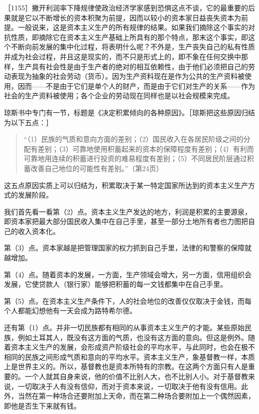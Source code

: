 ［1155］撇开利润率下降规律使政治经济学家感到恐惧这点不谈，它的最重要的后果就是它以不断增长的资本积聚为前提，因而以较小的资本家日益丧失资本为前提。一般说来，这是资本主义生产的所有规律的结果。如果我们摘除这个事实的对抗性质，即摘除它在资本主义生产基础上所具有的那个特点，那末这个事实，即这个不断向前发展的集中化过程，将表明什么呢？不外是，生产丧失自己的私有性质并成为社会过程，并且这是现实的，而不只是形式上的，即不象在任何交换中那样，生产具有社会性是由于生产者的绝对的相互依赖性，由于他们必须把自己的劳动表现为抽象的社会劳动（货币）。因为生产资料现在是作为公共的生产资料被使用，因而——不是由于它们是单个人的财产，而是由于它们对生产的关系——作为社会的生产资料被使用；各个企业的劳动现在同样也是以社会规模来完成。

琼斯书中专门有一节，标题是《决定积累倾向的各种原因》。［琼斯把这些原因归结为以下五点：］

\begin{quote}{“（1）民族的气质和意向方面的差别；（2）国民收入在各居民阶级之间的分配有差别；（3）可靠地使用积蓄起来的资本的保障程度有差别；（4）有利而可靠地用连续的积蓄进行投资的难易程度有差别；（5）不同居民阶层通过积蓄改善自己地位的可能性有差别。”（第24页）}\end{quote}

这五点原因实质上可以归结为，积累取决于某一特定国家所达到的资本主义生产方式的发展阶段。

我们首先看一看第（2）点。资本主义生产发达的地方，利润是积累的主要源泉，即资本家把最大部分国民收入集中在自己手里，甚至一部分土地所有者也力图把自己的收入资本化。

第（3）点。资本家越是把管理国家的权力抓到自己手里，法律的和警察的保障就越增加。

第（4）点。随着资本的发展，一方面，生产领域会增大，另一方面，信用组织会发展，它使贷款人（银行家）能够把积蓄的每一文钱都集中在自己手里。

第（5）点。在资本主义生产条件下，人的社会地位的改善仅仅取决于金钱，而每个人都能幻想他有一天会成为路特希尔德。

还有第（1）点。并非一切民族都有相同的从事资本主义生产的才能。某些原始民族，例如土耳其人，既没有这方面的气质，也没有这方面的意向。但这是例外。随着资本主义生产的发展，会形成资产阶级社会的平均水平，与此同时，也会在极不相同的民族之间形成气质和意向的平均水平。资本主义生产，象基督教一样，本质上是世界主义的。所以，基督教也是资本所特有的宗教。在这两个方面只有人是重要的。一个人就其自身来说，他的价值不比别人大，也不比别人小。对于基督教来说，一切取决于人有没有信仰，而对于资本来说，一切取决于他有没有信用。此外，当然在第一种场合还要附加上天命，而在第二种场合要附加上一个偶然因素，即他是否生下来就有钱。

